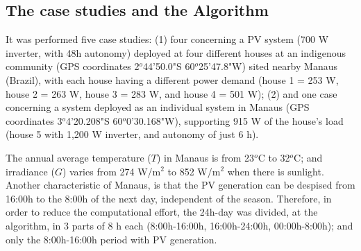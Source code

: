 \documentclass[journal]{IEEEtran}
\begin{document}
\subsection{The case studies and the Algorithm}
It was performed five case studies: (1) four concerning a PV system (700 W inverter, with 48h autonomy) deployed at four different houses at an indigenous community (GPS coordinates 2$^{o}$44'50.0"S 60$^{o}$25'47.8"W) sited nearby Manaus (Brazil), with each house having a different power demand (house 1 = 253 W, house 2 = 263 W, house 3 = 283 W, and house 4 = 501 W); (2) and one case concerning a system deployed as an individual system in Manaus (GPS coordinates 3$^{o}$4'20.208"S 60$^{o}$0'30.168"W), supporting 915 W of the house's load (house 5 with 1,200 W inverter, and autonomy of just 6 h). 
%
%
%

The annual average temperature ($T$) in Manaus is from 23$^{o}$C to 32$^{o}$C; and irradiance ($G$) varies from 274 W/m$^{2}$ to 852 W/m$^{2}$ when there is sunlight.  
Another characteristic of Manaus, is that the PV generation can be despised from 16:00h to the 8:00h of the next day, independent of the season.
Therefore, in order to reduce the computational effort,
the 24h-day was divided, at the algorithm, in 3 parts of 8 h each (8:00h-16:00h, 16:00h-24:00h, 00:00h-8:00h); and only the 8:00h-16:00h period with PV generation. 
\end{document}

